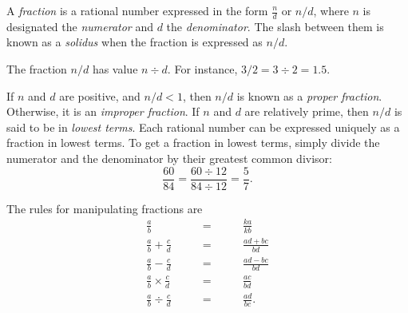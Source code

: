 \documentclass[12pt]{article}
\begin{document}
A \emph{fraction} is a rational number expressed in the form $\frac{n}{d}$ or $n/d$, where $n$ is designated the \emph{numerator} and $d$ the \emph{denominator}. The slash between them is known as a \emph{solidus} when the fraction is expressed as $n/d$.

The fraction $n/d$ has value $n \div d$. For instance, $3/2 = 3 \div 2 = 1.5$. 

If $n$ and $d$ are positive, and $n/d < 1$, then $n/d$ is known as a \emph{proper fraction}. Otherwise, it is an \emph{improper fraction}. If $n$ and $d$ are relatively prime, then $n/d$ is said to be in \emph{lowest terms}. Each rational number can be expressed uniquely as a fraction in lowest terms.  To get a fraction in lowest terms, simply divide the numerator and the denominator by their greatest common divisor:
$$\frac{60}{84} = \frac{60 \div 12}{84 \div 12} = \frac{5}{7}.$$

The rules for manipulating fractions are
\begin{eqnarray*}
   \frac{a}{b} & \qquad = \qquad & \frac{ka}{kb}\\
   \frac{a}{b} + \frac{c}{d} & \qquad = & \frac{ad + bc}{bd}\\
   \frac{a}{b} - \frac{c}{d} & \qquad = & \frac{ad - bc}{bd}\\
   \frac{a}{b} \times \frac{c}{d} & \qquad = & \frac{ac}{bd}\\
   \frac{a}{b} \div \frac{c}{d} & \qquad = & \frac{ad}{bc}.
\end{eqnarray*}
\end{document}
